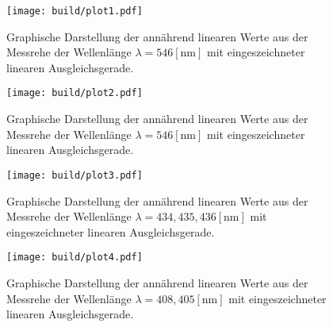 \begin{figure}
    \centering
    \texttt{[image: build/plot1.pdf]}
    \caption{Graphische Darstellung der annährend linearen Werte aus der Messrehe der Wellenlänge $\lambda = 546 [\si{\nano\meter}]$ mit eingeszeichneter linearen Ausgleichsgerade.} 
    \label{fig:müdes}
\end{figure}

\begin{figure}
    \centering
    \texttt{[image: build/plot2.pdf]}
    \caption{Graphische Darstellung der annährend linearen Werte aus der Messrehe der Wellenlänge $\lambda = 546 [\si{\nano\meter}]$ mit eingeszeichneter linearen Ausgleichsgerade.} 
    \label{fig:grün}
\end{figure}

\begin{figure}
    \centering
    \texttt{[image: build/plot3.pdf]}
    \caption{Graphische Darstellung der annährend linearen Werte aus der Messrehe der Wellenlänge $\lambda = 434,435,436 [\si{\nano\meter}]$ mit eingeszeichneter linearen Ausgleichsgerade.} 
    \label{fig:violet}
\end{figure}

\begin{figure}
    \centering
    \texttt{[image: build/plot4.pdf]}
    \caption{Graphische Darstellung der annährend linearen Werte aus der Messrehe der Wellenlänge $\lambda = 408,405 [\si{\nano\meter}]$ mit eingeszeichneter linearen Ausgleichsgerade.} 
    \label{fig:GIGAviolet}
\end{figure}







